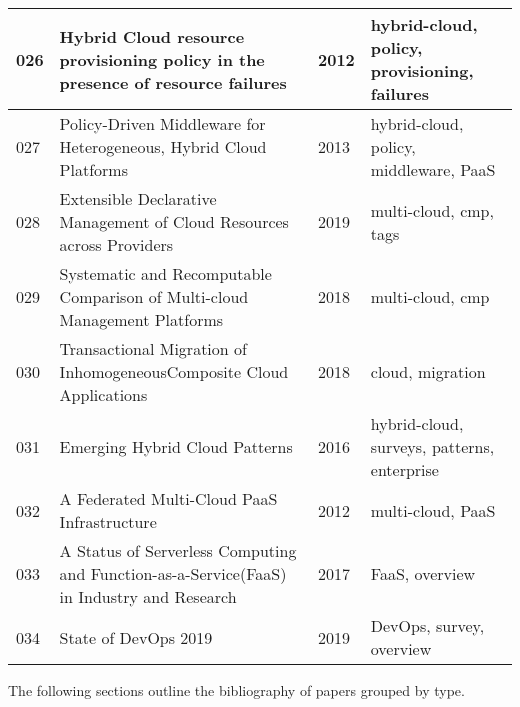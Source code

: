\documentclass[11pt,a4paper]{article}
\begin{document}
\begin{longtable}{L{0.6cm}L{7.5cm}L{0.9cm}L{4cm}}
        026 & Hybrid Cloud resource provisioning policy in the presence of resource failures\cite{coll:026} & 2012 & hybrid-cloud, policy, provisioning, failures \\  & Policy-Driven Middleware for Heterogeneous, Hybrid Cloud Platforms\cite{coll:027} & 2013 & hybrid-cloud, policy, middleware, PaaS \\  & Extensible Declarative Management of Cloud Resources across Providers\cite{coll:028} & 2019 & multi-cloud, cmp, tags \\  & Systematic and Recomputable Comparison of Multi-cloud Management Platforms\cite{coll:029} & 2018 & multi-cloud, cmp \\  & Transactional Migration of InhomogeneousComposite Cloud Applications\cite{coll:030} & 2018 & cloud, migration \\  & Emerging Hybrid Cloud Patterns\cite{coll:031} & 2016 & hybrid-cloud, surveys, patterns, enterprise \\  & A Federated Multi-Cloud PaaS Infrastructure\cite{coll:032} & 2012 & multi-cloud, PaaS \\  & A Status of Serverless Computing and Function-as-a-Service(FaaS) in Industry and Research\cite{coll:033} & 2017 & FaaS, overview \\  & State of DevOps 2019\cite{coll:034} & 2019 & DevOps, survey, overview \\ \midrule
        \bottomrule
    \end{longtable}

    The following sections outline the bibliography of papers grouped by type.

    \printbibliography[heading=subbibliography,title={Books},type=book]
    \printbibliography[heading=subbibliography,title={Articles},type=article]
    \printbibliography[heading=subbibliography,title={Inbooks},type=inbook]
    \printbibliography[heading=subbibliography,title={Inproceedings},type=inproceedings]
    \printbibliography[heading=subbibliography,title={Reports},type=report]
\end{document}
